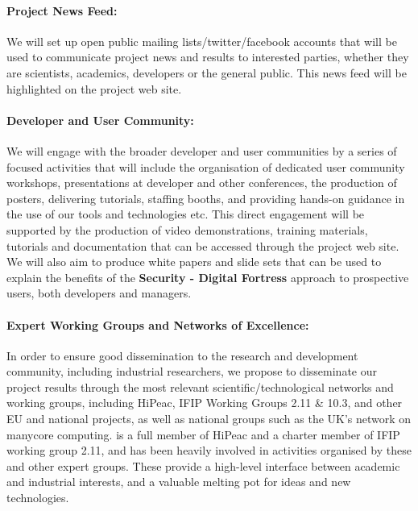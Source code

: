 \documentclass[a4paper,11pt]{article}
\newcommand{\project}[1]{\textbf{#1}\xspace}
\newcommand{\SECURITY}{\project{Security - Digital Fortress}}
\newcommand{\TheProject}{\SECURITY}
\begin{document}
\paragraph{Project News Feed:}  We will set up open public mailing lists/twitter/facebook accounts that will
be used to communicate project news and results to interested parties, whether they are scientists, academics, developers
or the general public.  This news feed will be highlighted on the project web site.

\paragraph{Developer and User Community:} We will engage with the broader
developer and user communities by a series of focused activities
that will include the organisation of dedicated user community workshops, presentations at
 developer and other conferences, 
 the production of posters, delivering tutorials, staffing booths, and providing hands-on
 guidance in the use of our tools and technologies etc.  This direct engagement will be
 supported by the production of video demonstrations, training materials, tutorials and documentation that can
 be accessed through the project web site.  We will also aim to produce white papers and slide sets that
 can be used to explain the benefits of the \TheProject{} approach to prospective users, both developers
 and managers.

 \paragraph{Expert Working Groups and Networks of Excellence:}
In order to ensure good dissemination to the research and development
community, including industrial researchers, we propose to disseminate
our project results through the most relevant scientific/technological
networks and working groups, including HiPeac,%
IFIP Working Groups 2.11 \& 10.3, and other EU and national projects,
as well as national groups such as the UK's network on manycore computing.
\SAshort{} is a full member of HiPeac and a charter member of IFIP working
group 2.11, and has been heavily involved in activities organised by these and other expert groups.
These provide a high-level interface between academic and industrial interests, and a valuable
melting pot for ideas and new technologies. 
\end{document}
